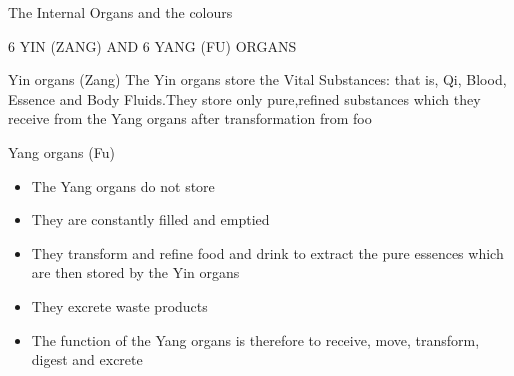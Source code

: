 \documentclass[
	11pt, %
]{beamer}
\theoremstyle{newblock}
\begin{document}
\begin{frame}
{\begin{block}{The Internal Organs and the colours}
		\end{block}
	}
\end{frame}
\begin{frame}{6 YIN (ZANG) AND 6 YANG (FU) ORGANS}
	\begin{block}{Yin organs (Zang)}
		The Yin organs store the Vital Substances: that is, Qi, Blood,
Essence and Body Fluids.They store only pure,refined substances
which they receive from the Yang organs after transformation
from foo
	\end{block}
	\begin{block}{Yang organs (Fu)}
		\begin{itemize}
			\item The Yang organs do not store
			\item They are constantly filled and emptied
			\item They transform and refine food and drink to extract the
			pure essences which are then stored by the Yin organs
			\item They excrete waste products
			\item The function of the Yang organs is therefore to receive,
			move, transform, digest and excrete
		\end{itemize}
	\end{block}
\end{frame}
\end{document}

